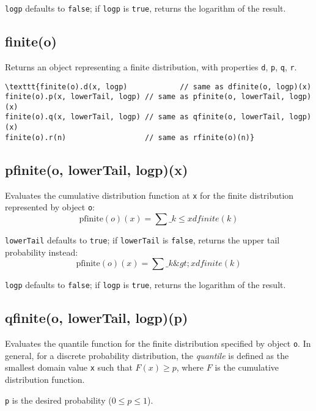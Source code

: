 \documentclass{article}
\begin{document}
\texttt{logp} defaults to \texttt{false}; if \texttt{logp} is \texttt{true}, returns the
logarithm of the result.


    \subsection*{finite(o)}
    Returns an object representing a finite distribution, with properties
\texttt{d}, \texttt{p}, \texttt{q}, \texttt{r}.


\begin{lstlisting}
\texttt{finite(o).d(x, logp)            // same as dfinite(o, logp)(x)
finite(o).p(x, lowerTail, logp) // same as pfinite(o, lowerTail, logp)(x)
finite(o).q(x, lowerTail, logp) // same as qfinite(o, lowerTail, logp)(x)
finite(o).r(n)                  // same as rfinite(o)(n)}\end{lstlisting}

    \subsection*{pfinite(o, lowerTail, logp)(x)}
    Evaluates the cumulative distribution function at \texttt{x}
for the finite distribution represented by object \texttt{o}:
$$\textrm{pfinite}(o)(x) = \sum\_{k \leq x} dfinite(k)$$


\texttt{lowerTail} defaults to \texttt{true}; if \texttt{lowerTail} is \texttt{false}, returns
the upper tail probability instead:
$$\textrm{pfinite}(o)(x) = \sum\_{k \&gt; x} dfinite(k)$$


\texttt{logp} defaults to \texttt{false}; if \texttt{logp} is \texttt{true}, returns the logarithm
of the result.


    \subsection*{qfinite(o, lowerTail, logp)(p)}
    Evaluates the quantile function for the finite distribution
specified by object \texttt{o}.
In general, for a discrete probability
distribution, the \emph{quantile} is defined as the smallest domain value
\texttt{x} such that $F(x) \geq p$, where $F$ is the cumulative
distribution function.


\texttt{p} is the desired probability ($0 \leq p \leq 1$).
\end{document}
